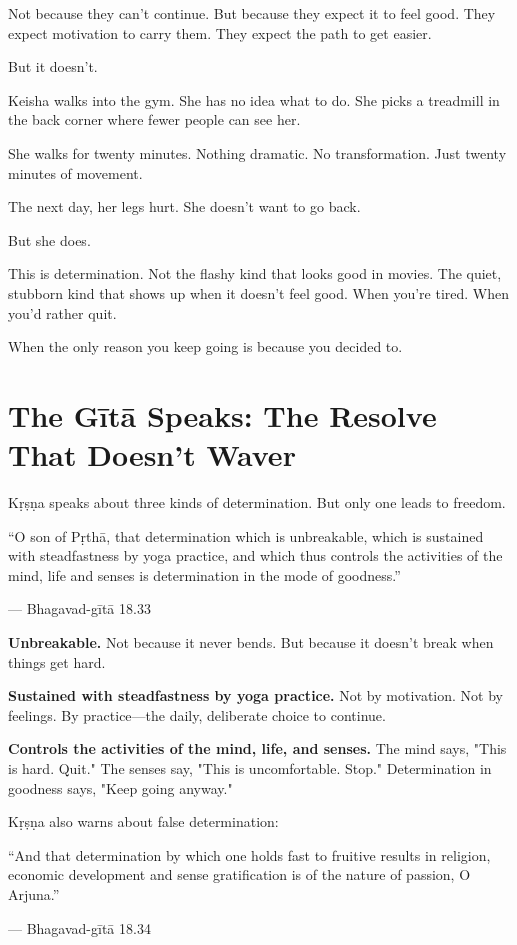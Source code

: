 \documentclass[11pt,twoside]{book}
\begin{document}
Not because they can't continue. But because they expect it to feel good. They expect motivation to carry them. They expect the path to get easier.

But it doesn't.

Keisha walks into the gym. She has no idea what to do. She picks a treadmill in the back corner where fewer people can see her.

She walks for twenty minutes. Nothing dramatic. No transformation. Just twenty minutes of movement.

The next day, her legs hurt. She doesn't want to go back.

But she does.

This is determination. Not the flashy kind that looks good in movies. The quiet, stubborn kind that shows up when it doesn't feel good. When you're tired. When you'd rather quit.

When the only reason you keep going is because you decided to.

\section*{The Gītā Speaks: The Resolve That Doesn't Waver}

Kṛṣṇa speaks about three kinds of determination. But only one leads to freedom.

\begin{pullquote}
``O son of Pṛthā, that determination which is unbreakable, which is sustained with steadfastness by yoga practice, and which thus controls the activities of the mind, life and senses is determination in the mode of goodness.''

--- Bhagavad-gītā 18.33
\end{pullquote}

\textbf{\textbf{Unbreakable.}} Not because it never bends. But because it doesn't break when things get hard.

\textbf{\textbf{Sustained with steadfastness by yoga practice.}} Not by motivation. Not by feelings. By practice—the daily, deliberate choice to continue.

\textbf{\textbf{Controls the activities of the mind, life, and senses.}} The mind says, "This is hard. Quit." The senses say, "This is uncomfortable. Stop." Determination in goodness says, "Keep going anyway."

Kṛṣṇa also warns about false determination:

\begin{pullquote}
``And that determination by which one holds fast to fruitive results in religion, economic development and sense gratification is of the nature of passion, O Arjuna.''

--- Bhagavad-gītā 18.34
\end{pullquote}
\end{document}
